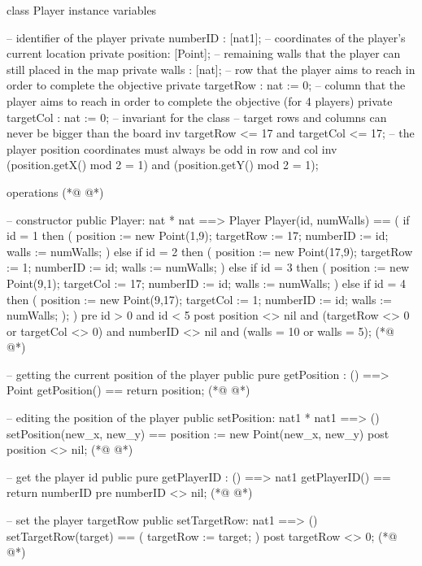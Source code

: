 \begin{vdmpp}[breaklines=true]
class Player
instance variables

   -- identifier of the player
   private numberID : [nat1];
   -- coordinates of the player's current location
   private position: [Point];
   -- remaining walls that the player can still placed in the map
   private walls : [nat];
   -- row that the player aims to reach in order to complete the objective
   private targetRow : nat := 0;
   -- column that the player aims to reach in order to complete the objective (for 4 players)
   private targetCol : nat := 0;
   -- invariant for the class
   -- target rows and columns can never be bigger than the board
   inv targetRow <= 17 and targetCol <= 17;
   -- the player position coordinates must always be odd in row and col
   inv (position.getX() mod 2 = 1) and (position.getY() mod 2 = 1);
   
operations
(*@
\label{Player:21}
@*)

   -- constructor
   public Player: nat * nat ==> Player
   Player(id, numWalls) ==
   (
    if id = 1
    then (
     position := new Point(1,9);
     targetRow := 17;
     numberID := id;
     walls := numWalls;
    )
    else if id = 2
    then (
     position := new Point(17,9);
     targetRow := 1;
     numberID := id;
     walls := numWalls;
    )
    else if id = 3
    then (
     position := new Point(9,1);
     targetCol := 17;
     numberID := id;
     walls := numWalls;
    )
    else if id = 4
    then (
     position := new Point(9,17);
     targetCol := 1;
     numberID := id;
     walls := numWalls;
    );
   )
   pre id > 0 and id < 5
   post position <> nil and (targetRow <> 0 or targetCol <> 0) and numberID <> nil and (walls = 10 or walls = 5);
(*@
\label{getPosition:57}
@*)
   
   -- getting the current position of the player
   public pure getPosition : () ==> Point 
   getPosition() == return position;
(*@
\label{setPosition:61}
@*)
   
   -- editing the position of the player
   public setPosition: nat1 * nat1 ==> ()
   setPosition(new_x, new_y) ==
    position := new Point(new_x, new_y)
   post position <> nil;
(*@
\label{getPlayerID:67}
@*)

   -- get the player id
   public pure getPlayerID : () ==> nat1
   getPlayerID() ==
    return numberID
   pre numberID <> nil;
(*@
\label{setTargetRow:73}
@*)
   
   -- set the player targetRow
   public setTargetRow: nat1 ==> ()
   setTargetRow(target) ==
   (
    targetRow := target;
   )
   post targetRow <> 0;
(*@
\label{setTargetCol:81}
@*)
   

\end{vdmpp}
